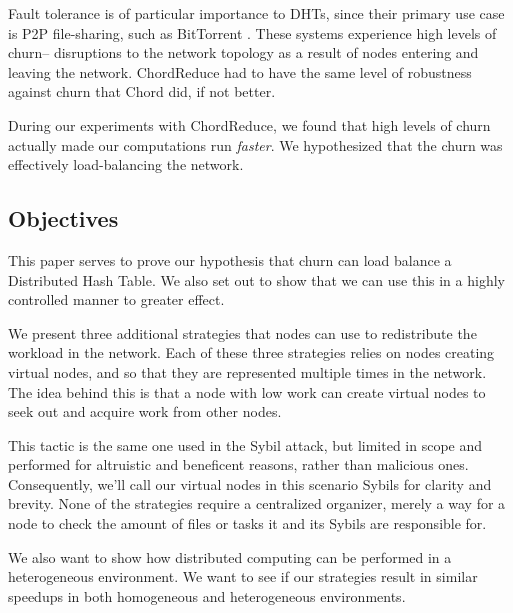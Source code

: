 Fault tolerance is of particular importance to DHTs, since their primary use case is P2P file-sharing, such as BitTorrent \cite{bittorrent}.
These systems experience high levels of churn-- disruptions to the network topology as a result of nodes entering and leaving the network.
ChordReduce had to have the same level of robustness against churn that Chord did, if not better.

During our experiments with ChordReduce, we found that high levels of churn actually made our computations run \textit{faster}.
We hypothesized that the churn was effectively load-balancing the network.

\subsection{Objectives}
This paper serves to prove our hypothesis that churn can load balance a Distributed Hash Table.
We also set out to show that we can use this in a highly controlled manner to greater effect.

We present three additional strategies that nodes can use to redistribute the workload in the network.
Each of these three strategies relies on nodes creating virtual nodes, and so that they are represented multiple times in the network.
The idea behind this is that a node with low work can create virtual nodes to seek out and acquire work from other nodes.

This tactic is the same one used in the Sybil \cite{sybil} attack, but limited in scope and performed for altruistic and beneficent reasons, rather than malicious ones.
Consequently, we'll call our virtual nodes in this scenario Sybils for clarity and brevity.
None of the strategies require a centralized organizer, merely a way for a node to check the amount of files or tasks it and its Sybils are responsible for.


We also want to show how distributed computing can be performed in a heterogeneous environment.
We want to see if our strategies result in similar speedups in both homogeneous and heterogeneous environments.

%
%

